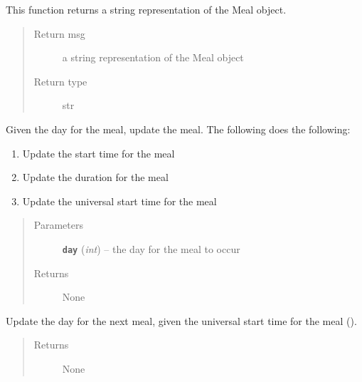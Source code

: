 \documentclass[letterpaper,10pt,english]{sphinxmanual}
\begin{document}
\begin{fulllineitems}
\begin{fulllineitems}
\end{fulllineitems}


\begin{fulllineitems}
\label{meal:meal.Meal.toString}
This function returns a string representation of the Meal object.
\begin{quote}\begin{description}
\item[{Return msg}] \leavevmode
a string representation of the Meal object

\item[{Return type}] \leavevmode
str

\end{description}\end{quote}

\end{fulllineitems}


\begin{fulllineitems}
\label{meal:meal.Meal.update}
Given the day for the meal, update the meal. The following does the following:
\begin{enumerate}
\item {} 
Update the start time for the meal

\item {} 
Update the duration for the meal

\item {} 
Update the universal start time for the meal

\end{enumerate}
\begin{quote}\begin{description}
\item[{Parameters}] \leavevmode
\textbf{\texttt{day}} (\emph{int}) -- the day for the meal to occur

\item[{Returns}] \leavevmode
None

\end{description}\end{quote}

\end{fulllineitems}


\begin{fulllineitems}
\label{meal:meal.Meal.update_day}
Update the day for the next meal, given the universal start time for the meal ().
\begin{quote}\begin{description}
\item[{Returns}] \leavevmode
None


\end{description}
\end{quote}
\end{fulllineitems}
\end{fulllineitems}
\end{document}
